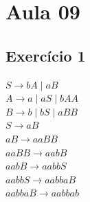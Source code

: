 \section*{Aula 09}
    \subsection*{Exercício 1}
        $S \rightarrow bA \mid aB$ \\
        $A \rightarrow a \mid aS \mid bAA$ \\
        $B \rightarrow b \mid bS \mid aBB$ \\
        
        $S \rightarrow aB$ \\
        $aB \rightarrow aaBB$ \\
        $aaBB \rightarrow aabB$ \\
        $aabB \rightarrow aabbS$ \\
        $aabbS \rightarrow aabbaB$ \\
        $aabbaB \rightarrow aabbab$ \\

